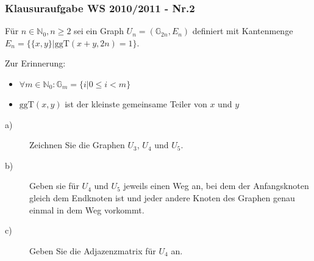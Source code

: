 \begin{frame}
	\frametitle{Klausuraufgabe WS 2010/2011 - Nr.2}
	Für $n\in \mathbb{N}_0, n \geq 2$ sei ein Graph $U_n=(\mathbb{G}_{2n},E_n)$ definiert mit Kantenmenge $E_n=\{\{x,y\}|\text{ggT}(x+y,2n)=1\}$.\\
	\vspace{.2cm}
	\begin{exampleblock}{Zur Erinnerung:}
		\begin{itemize}
			\item $\forall m\in \mathbb{N}_0: \mathbb{G}_m=\{i|0\leq i<m\}$
			\item $\text{ggT}(x,y)$ ist der kleinste gemeinsame Teiler von $x$ und $y$
		\end{itemize}
	\end{exampleblock}
	\begin{description}
		\item[a)] Zeichnen Sie die Graphen $U_3$, $U_4$ und $U_5$.
		\item[b)] Geben sie für $U_4$ und $U_5$ jeweils einen Weg an, bei dem der Anfangsknoten gleich dem Endknoten ist und jeder andere Knoten des Graphen genau einmal in dem Weg vorkommt.
		\item[c)] Geben Sie die Adjazenzmatrix für $U_4$ an.
	\end{description}
\end{frame}
